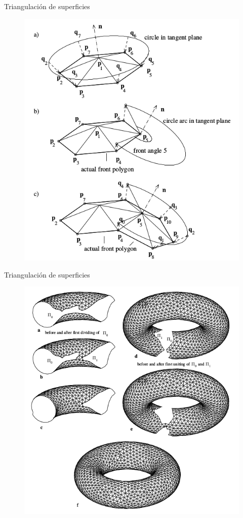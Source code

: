 \documentclass{beamer}
\begin{document}
\begin{frame}{Triangulación de superficies}
	\begin{figure}[h]
	\centering
	\includegraphics[scale=0.3]{images/hartmann3.png}
	\end{figure}
\end{frame}

\begin{frame}{Triangulación de superficies}
	\begin{figure}[h]
	\centering
	\includegraphics[scale=0.3]{images/hartmann8.png}
	\end{figure}
\end{frame}
\end{document}
